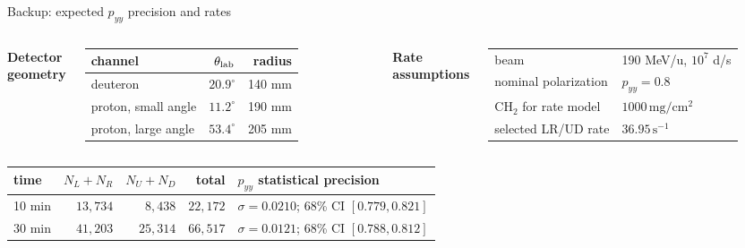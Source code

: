 \documentclass[aspectratio=169,11pt]{beamer}
\begin{document}
\begin{frame}{Backup: expected \texorpdfstring{$p_{yy}$}{pyy} precision and rates}
  \begin{columns}[T,onlytextwidth]
      \textbf{Detector geometry}

      \renewcommand{\arraystretch}{1.08}
      \begin{tabularx}{\textwidth}{Y r r}
        channel & $\theta_{\rm lab}$ & radius \\
        \midrule
        deuteron & $20.9^\circ$ & 140 mm \\
        proton, small angle & $11.2^\circ$ & 190 mm \\
        proton, large angle & $53.4^\circ$ & 205 mm \\
      \end{tabularx}
      \textbf{Rate assumptions}

      \renewcommand{\arraystretch}{1.16}
      \begin{tabularx}{\textwidth}{Y l}
        beam & 190 MeV/u, $10^7$ d/s \\
        nominal polarization & $p_{yy}=0.8$ \\
        CH$_2$ for rate model & $1000\,\mathrm{mg/cm^2}$ \\
        selected LR/UD rate & $36.95\,\mathrm{s^{-1}}$ \\
      \end{tabularx}
  \end{columns}

  \vspace{0.30em}
  \renewcommand{\arraystretch}{1.10}
  \begin{tabularx}{\textwidth}{l r r r Y}
    time & $N_L+N_R$ & $N_U+N_D$ & total & $p_{yy}$ statistical precision \\
     min & $13{,}734$ & $8{,}438$ & $22{,}172$ & $\sigma=0.0210$; 68\% CI $[0.779,0.821]$ \\
    30 min & $41{,}203$ & $25{,}314$ & $66{,}517$ & $\sigma=0.0121$; 68\% CI $[0.788,0.812]$ \\
  \end{tabularx}

\end{frame}
\end{document}
